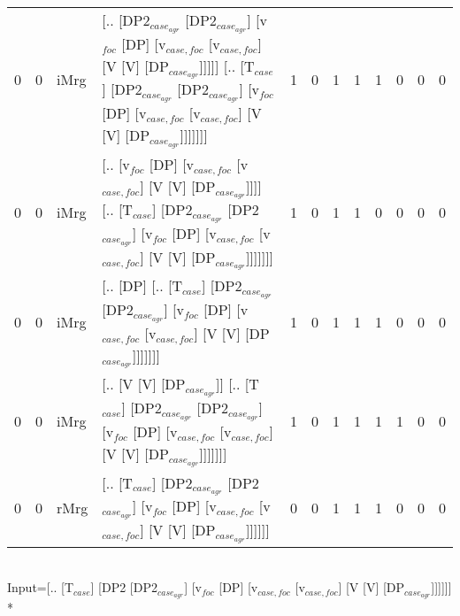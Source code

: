 \begin{tabularx}{\linewidth}{rrlXrrrrrrrr}
   0 &   0 & iMrg & [.. [DP2$_{case_{agr}}$ [DP2$_{case_{agr}}$] [v$_{foc}$ [DP] [v$_{case,foc}$ [v$_{case,foc}$] [V [V] [DP$_{case_{agr}}$]]]]] [.. [T$_{case}$] [DP2$_{case_{agr}}$ [DP2$_{case_{agr}}$] [v$_{foc}$ [DP] [v$_{case,foc}$ [v$_{case,foc}$] [V [V] [DP$_{case_{agr}}$]]]]]]] &            1 &              0 &             1 &             1 &             1 &                  0 &            0 &              0 \\
   0 &   0 & iMrg & [.. [v$_{foc}$ [DP] [v$_{case,foc}$ [v$_{case,foc}$] [V [V] [DP$_{case_{agr}}$]]]] [.. [T$_{case}$] [DP2$_{case_{agr}}$ [DP2$_{case_{agr}}$] [v$_{foc}$ [DP] [v$_{case,foc}$ [v$_{case,foc}$] [V [V] [DP$_{case_{agr}}$]]]]]]]                               &            1 &              0 &             1 &             1 &             0 &                  0 &            0 &              0 \\
   0 &   0 & iMrg & [.. [DP] [.. [T$_{case}$] [DP2$_{case_{agr}}$ [DP2$_{case_{agr}}$] [v$_{foc}$ [DP] [v$_{case,foc}$ [v$_{case,foc}$] [V [V] [DP$_{case_{agr}}$]]]]]]]                                                                                       &            1 &              0 &             1 &             1 &             1 &                  0 &            0 &              0 \\
   0 &   0 & iMrg & [.. [V [V] [DP$_{case_{agr}}$]] [.. [T$_{case}$] [DP2$_{case_{agr}}$ [DP2$_{case_{agr}}$] [v$_{foc}$ [DP] [v$_{case,foc}$ [v$_{case,foc}$] [V [V] [DP$_{case_{agr}}$]]]]]]]                                                                      &            1 &              0 &             1 &             1 &             1 &                  1 &            0 &              0 \\
   0 &   0 & rMrg & [.. [T$_{case}$] [DP2$_{case_{agr}}$ [DP2$_{case_{agr}}$] [v$_{foc}$ [DP] [v$_{case,foc}$ [v$_{case,foc}$] [V [V] [DP$_{case_{agr}}$]]]]]]                                                                                                 &            0 &              0 &             1 &             1 &             1 &                  0 &            0 &              0 \\
\hline
\end{tabularx}\endgroup\\
\begingroup\scriptsize Input=[.. [T$_{case}$] [DP2 [DP2$_{case_{agr}}$] [v$_{foc}$ [DP] [v$_{case,foc}$ [v$_{case,foc}$] [V [V] [DP$_{case_{agr}}$]]]]]]\\*
